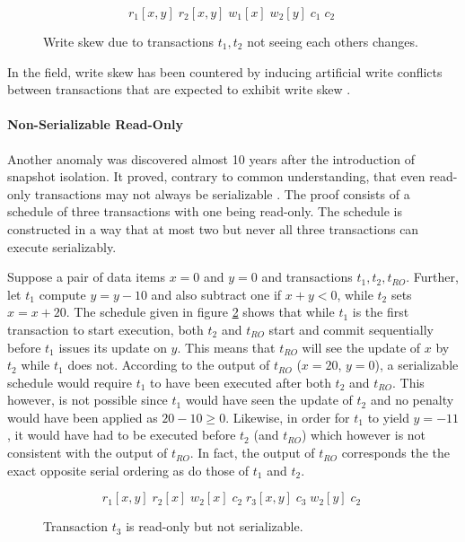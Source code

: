\begin{figure}
    \centering
    \[
        r_1[x,y]\; r_2[x,y]\; w_1[x]\; w_2[y]\; c_1\; c_2\;
    \]
    \caption{Write skew due to transactions $t_1, t_2$ not seeing each others changes.}
    \label{fig:write_skew}
\end{figure}

In the field, write skew has been countered by inducing artificial write
conflicts between transactions that are expected to exhibit write skew
\cite{fekete2005making}.

\paragraph{Non-Serializable Read-Only}

Another anomaly was discovered almost 10 years after the introduction of
snapshot isolation. It proved, contrary to common understanding, that even
read-only transactions may not always be serializable \cite{fekete2004read}. The
proof consists of a schedule of three transactions with one being read-only. The
schedule is constructed in a way that at most two but never all three
transactions can execute serializably.

Suppose a pair of data items $x = 0$ and $y = 0$ and transactions $t_1, t_2,
t_{RO}$. Further, let $t_1$ compute $y = y - 10$ and also subtract one if $x + y <
0$, while $t_2$ sets $x = x + 20$. The schedule given in figure
\ref{fig:bad_read_only} shows that while $t_1$ is the first transaction to start
execution, both $t_2$ and $t_{RO}$ start and commit sequentially before $t_1$
issues its update on $y$. This means that $t_{RO}$ will see the update of $x$ by
$t_2$ while $t_1$ does not. According to the output of $t_{RO}$ ($x = 20$, $y =
0$), a serializable schedule would require $t_1$ to have been executed after
both $t_2$ and $t_{RO}$. This however, is not possible since $t_1$ would have
seen the update of $t_2$ and no penalty would have been applied as $20 - 10 \geq
0$. Likewise, in order for $t_1$ to yield $y = -11$, it would have had to be
executed before $t_2$ (and $t_{RO}$) which however is not consistent with the
output of $t_{RO}$. In fact, the output of $t_{RO}$ corresponds the the exact
opposite serial ordering as do those of $t_1$ and $t_2$.

\begin{figure}[h!]
    \centering
    \[
        r_1[x,y]\; r_2[x]\; w_2[x]\; c_2\; r_3[x,y]\; c_3\; w_2[y]\; c_2\;
    \]
    \caption{Transaction $t_3$ is read-only but not serializable.}
    \label{fig:bad_read_only}
\end{figure}

